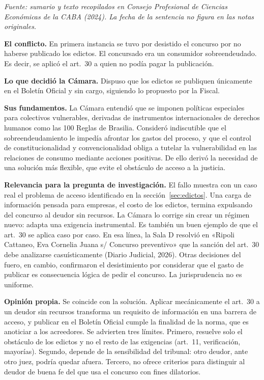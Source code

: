 \documentclass[12pt,oneside]{book}
\begin{document}
\textit{Fuente: sumario y texto recopilados en Consejo Profesional de Ciencias Económicas de la CABA (2024). La fecha de la sentencia no figura en las notas originales.}

\textbf{El conflicto.} En primera instancia se tuvo por desistido el concurso por no haberse publicado los edictos. El concursado era un consumidor sobreendeudado. Es decir, se aplicó el art.~30 a quien no podía pagar la publicación.

\textbf{Lo que decidió la Cámara.} Dispuso que los edictos se publiquen únicamente en el Boletín Oficial y sin cargo, siguiendo lo propuesto por la Fiscal.

\textbf{Sus fundamentos.} La Cámara entendió que se imponen políticas especiales para colectivos vulnerables, derivadas de instrumentos internacionales de derechos humanos como las 100 Reglas de Brasilia. Consideró indiscutible que el sobreendeudamiento le impedía afrontar los gastos del proceso, y que el control de constitucionalidad y convencionalidad obliga a tutelar la vulnerabilidad en las relaciones de consumo mediante acciones positivas. De ello derivó la necesidad de una solución más flexible, que evite el obstáculo de acceso a la justicia.

\textbf{Relevancia para la pregunta de investigación.} El fallo muestra con un caso real el problema de acceso identificado en la sección~\ref{sec:edictos}. Una carga de información pensada para empresas, el costo de los edictos, termina expulsando del concurso al deudor sin recursos. La Cámara lo corrige sin crear un régimen nuevo: adapta una exigencia instrumental. Es también un buen ejemplo de que el art.~30 se aplica caso por caso. En esa línea, la Sala D resolvió en «Ripoli Cattaneo, Eva Cornelia Juana s/ Concurso preventivo» que la sanción del art.~30 debe analizarse casuísticamente (Diario Judicial, 2026). Otras decisiones del fuero, en cambio, confirmaron el desistimiento por considerar que el gasto de publicar es consecuencia lógica de pedir el concurso. La jurisprudencia no es uniforme.

\textbf{Opinión propia.} Se coincide con la solución. Aplicar mecánicamente el art.~30 a un deudor sin recursos transforma un requisito de información en una barrera de acceso, y publicar en el Boletín Oficial cumple la finalidad de la norma, que es anoticiar a los acreedores. Se advierten tres límites. Primero, resuelve solo el obstáculo de los edictos y no el resto de las exigencias (art.~11, verificación, mayorías). Segundo, depende de la sensibilidad del tribunal: otro deudor, ante otro juez, podría quedar afuera. Tercero, no ofrece criterios para distinguir al deudor de buena fe del que usa el concurso con fines dilatorios.
\end{document}
